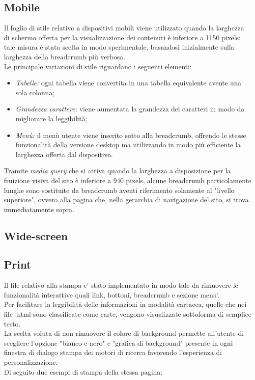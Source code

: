 \documentclass[]{article}
\begin{document}
\subsection{Mobile}
Il foglio di stile relativo a dispositivi mobili viene utilizzato quando la larghezza di schermo offerta per la visualizzazione dei contenuti è inferiore a 1150 pixels: tale misura è stata scelta in modo sperimentale, basandosi inizialmente sulla larghezza della breadcrumb più verbosa.\\
Le principale variazioni di stile riguardano i seguenti elementi:
\begin{itemize}
	\item \textit{Tabelle:} ogni tabella viene convertita in una tabella equivalente avente una sola colonna;
	\item \textit{Grandezza carattere:} viene aumentata la grandezza dei caratteri in modo da migliorare la leggibilità;
	\item \textit{Menù:} il menù utente viene inserito sotto alla breadcrumb, offrendo le stesse funzionalità della versione desktop ma utilizzando in modo più efficiente la larghezza offerta dal dispositivo.
\end{itemize}
Tramite \textit{media query} che si attiva quando la larghezza a disposizione per la fruizione visiva del sito è inferiore a 940 pixels, alcune breadcrumb particolamente lunghe sono sostituite da breadcrumb aventi riferimento solamente al "livello superiore", ovvero alla pagina che, nella gerarchia di navigazione del sito, si trova immediatamente sopra.
\subsection{Wide-screen}

\pagebreak
\subsection{Print}
Il file relativo alla stampa e' stato implementato in modo tale da rimuovere le funzionalità interattive quali link, bottoni, breadcrumb e sezione menu'.\\
Per facilitare la leggibilità delle informazioni in modalità cartacea, quelle che nei file .html sono classificate come carte, vengono visualizzate sottoforma di semplice testo.\\
La scelta voluta di non rimuovere il colore di background permette all'utente di scegliere l'opzione "bianco e nero" e "grafica di background" presente in ogni finestra di dialogo stampa dei motori di ricerca favorendo l'esperienza di personalizzazione.\\
Di seguito due  esempi di stampa della stessa pagina:\\
\end{document}
